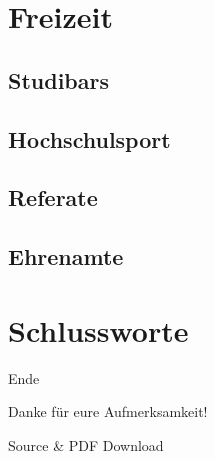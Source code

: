 \documentclass[
	aspectratio=169, 
	8pt 
]{beamer}
\begin{document}
\section{Freizeit}
\subsection{Studibars}
\subsection{Hochschulsport}
\subsection{Referate}
\subsection{Ehrenamte}



\section{Schlussworte}
\begin{frame}{Ende}
    \begin{fancycolumns}[widths={30}]
        \nextcolumn
        \begin{center}
            \LARGE{Danke für eure Aufmerksamkeit!}
        \end{center}
    \end{fancycolumns}
    
    \begin{fancycolumns}[widths={30}]
        \begin{center}
            Source \& PDF Download
        \end{center}
    \end{fancycolumns}
\end{frame}
\end{document}
